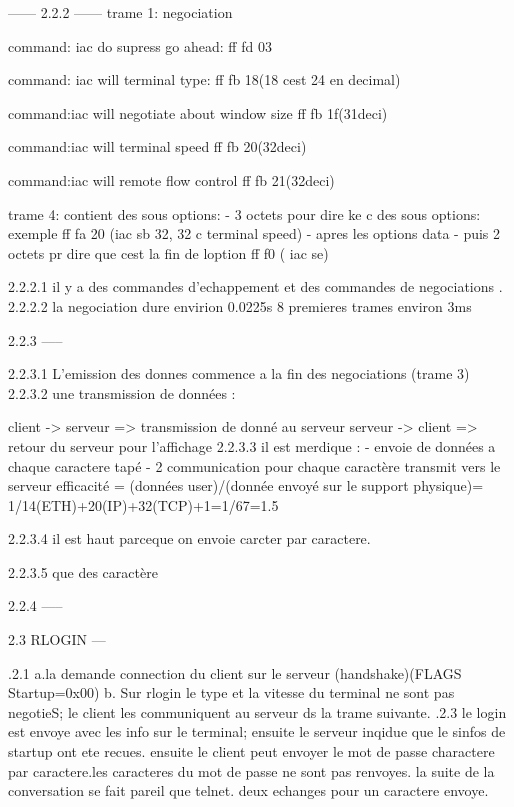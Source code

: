 ------
2.2.2
------
trame 1: negociation

command: iac  do   supress go ahead:
         ff   fd   03

command: iac   will terminal type:
         ff   fb    18(18 cest 24 en decimal)

command:iac    will negotiate about window size
        ff     fb   1f(31deci)

command:iac    will terminal speed
        ff     fb   20(32deci)

command:iac    will remote flow control
        ff     fb   21(32deci)


trame 4: contient des sous options:
- 3 octets pour dire ke c des sous options: exemple ff fa 20 (iac sb 32, 32 c terminal speed)
- apres les options data 
- puis 2 octets pr dire que cest la fin de loption ff f0 ( iac se)

2.2.2.1 il y a des commandes d'echappement et des commandes de negociations .
2.2.2.2 la negociation dure envirion 0.0225s 8 premieres trames environ 3ms


2.2.3
-----

2.2.3.1 L'emission des donnes commence a la fin des negociations (trame 3)
2.2.3.2 une transmission de données :

              client -> serveur => transmission de donné au serveur 
              serveur -> client => retour du serveur pour l'affichage
2.2.3.3 il est merdique :
  - envoie de données a chaque caractere tapé 
  - 2 communication pour chaque caractère transmit vers le serveur 
  efficacité = (données user)/(donnée envoyé sur le support physique)= 1/14(ETH)+20(IP)+32(TCP)+1=1/67=1.5%

2.2.3.4 il est haut parceque on envoie carcter par caractere.

2.2.3.5 que des caractère 

2.2.4
-----


2.3 RLOGIN
---


.2.1  a.la demande connection du client sur le serveur (handshake)(FLAGS Startup=0x00)
      b. Sur rlogin  le type et la vitesse du terminal ne sont pas negotieS; le client les communiquent au serveur ds la trame suivante.
 .2.3 le login est envoye avec les info sur le terminal; ensuite le serveur inqidue que le sinfos de startup ont ete recues. ensuite le client peut envoyer le mot de passe charactere par caractere.les caracteres du mot de passe ne sont pas renvoyes.
 la suite de la conversation  se fait pareil que telnet. deux echanges pour un caractere envoye.


